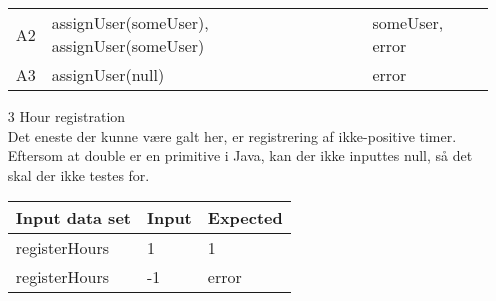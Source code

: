 \documentclass[a4paper,12pt]{article}
\begin{document}
\begin{enumerate}
\begin{center}
\begin{tabular}{|l|l|l|}
				A2 & assignUser(someUser), assignUser(someUser) & someUser, error \\
				A3 & assignUser(null) & error \\
				\hline
			\end{tabular}
			\end{center}
	\item[3] Hour registration \\
		Det eneste der kunne være galt her, er registrering af ikke-positive timer. Eftersom at double er en primitive i Java, kan der ikke inputtes null, så det skal der ikke testes for.
			\begin{center}
			\begin{tabular}{|l|l|l|}
				\hline
				Input data set & Input & Expected \\
				\hline
				registerHours & 1 & 1 \\
				registerHours & -1 & error \\
				\hline
			\end{tabular}
			\end{center}
\end{enumerate}
\end{document}
